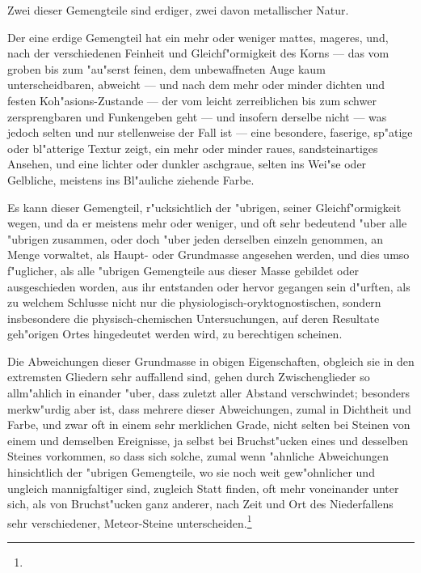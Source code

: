 \documentclass[a4paper, 11pt, oneside, german]{article}
\begin{document}
Zwei dieser Gemengteile sind erdiger, zwei davon metallischer Natur.

Der eine erdige Gemengteil hat ein mehr oder weniger mattes, mageres, und, nach der verschiedenen Feinheit und Gleichf"ormigkeit des Korns --- das vom groben bis zum "au"serst feinen, dem unbewaffneten Auge kaum unterscheidbaren, abweicht --- und nach dem mehr oder minder dichten und festen Koh"asions-Zustande --- der vom leicht zerreiblichen bis zum schwer zersprengbaren und Funkengeben geht --- und insofern derselbe nicht --- was jedoch selten und nur stellenweise der Fall ist --- eine besondere, faserige, sp"atige oder bl"atterige Textur zeigt, ein mehr oder minder raues, sandsteinartiges Ansehen, und eine lichter oder dunkler aschgraue, selten ins Wei"se oder Gelbliche, meistens ins Bl"auliche ziehende Farbe.

Es kann dieser Gemengteil, r"ucksichtlich der "ubrigen, seiner Gleichf"ormigkeit wegen, und da er meistens mehr oder weniger, und oft sehr bedeutend "uber alle "ubrigen zusammen, oder doch "uber jeden derselben einzeln genommen, an Menge vorwaltet, als Haupt- oder Grundmasse angesehen werden, und dies umso f"uglicher, als alle "ubrigen Gemengteile aus dieser Masse gebildet oder ausgeschieden worden, aus ihr entstanden oder hervor gegangen sein d"urften, als zu welchem Schlusse nicht nur die physiologisch-oryktognostischen, sondern insbesondere die physisch-chemischen Untersuchungen, auf deren Resultate geh"origen Ortes hingedeutet werden wird, zu berechtigen scheinen.

Die Abweichungen dieser Grundmasse in obigen Eigenschaften, obgleich sie in den extremsten Gliedern sehr auffallend sind, gehen durch Zwischenglieder so allm"ahlich in einander "uber, dass zuletzt aller Abstand verschwindet; besonders merkw"urdig aber ist, dass mehrere dieser Abweichungen, zumal in Dichtheit und Farbe, und zwar oft in einem sehr merklichen Grade, nicht selten bei Steinen von einem und demselben Ereignisse, ja selbst bei Bruchst"ucken eines und desselben Steines vorkommen, so dass sich solche, zumal wenn "ahnliche Abweichungen hinsichtlich der "ubrigen Gemengteile, wo sie noch weit gew"ohnlicher und ungleich mannigfaltiger sind, zugleich Statt finden, oft mehr voneinander unter sich, als von Bruchst"ucken ganz anderer, nach Zeit und Ort des Niederfallens sehr verschiedener, Meteor-Steine unterscheiden.\footnote{}
\end{document}
